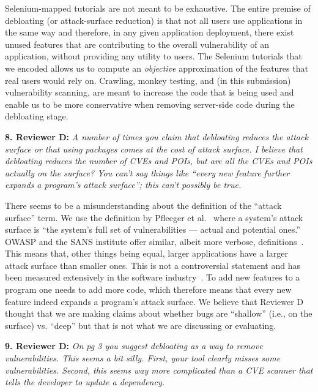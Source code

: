 \noindent Selenium-mapped tutorials are not meant to be exhaustive. The entire premise of debloating (or attack-surface reduction) is that not all users use applications in the same way and therefore, in any given application deployment, there exist unused features that are contributing to the overall vulnerability of an application, without providing any utility to users. The Selenium tutorials that we encoded allows us to compute an \textit{objective} approximation of the features that real users would rely on. Crawling, monkey testing, and (in this submission) vulnerability scanning, are meant to increase the code that is being used and enable us to be more conservative when removing server-side code during the debloating stage.

\vspace{1ex}

\noindent  \textbf{8. Reviewer D:} \textit{A number of times you claim that debloating reduces the attack surface or that using packages comes at the cost of attack surface. I believe that debloating reduces the number of CVEs and POIs, but are all the CVEs and POIs actually on the surface?
You can't say things like ``every new feature further expands a program's attack surface''; this can't possibly be true.}
\vspace{0.5ex}

\noindent There seems to be a misunderstanding about the definition of the ``attack surface'' term. We use the definition by Pfleeger et al.~\cite{pfleeger2015security} where a system's attack surface is ``the system's full set of vulnerabilities --- actual and potential ones.'' OWASP and the SANS institute offer similar, albeit more verbose, definitions~\cite{owasp-attacksurface,sans-attacksurface}. This means that, other things being equal, larger applications have a larger attack surface than smaller ones. This is not a controversial statement and has been measured extensively in the software industry~\cite{mcconnell2004code}. To add new features to a program one needs to add more code, which therefore means that every new feature indeed expands a program's attack surface. We believe that Reviewer D thought that we are making claims about whether bugs are ``shallow'' (i.e., on the surface) vs. ``deep'' but that is not what we are discussing or evaluating.

\vspace{1ex}

\noindent  \textbf{9. Reviewer D:} \textit{On pg 3 you suggest debloating as a way to remove vulnerabilities. This seems a bit silly. First, your tool clearly misses some vulnerabilities. Second, this seems way more complicated than a CVE scanner that tells the developer to update a dependency.}
\vspace{0.5ex}

